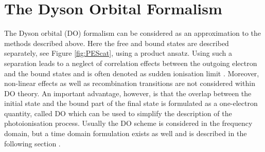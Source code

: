 %

\section{The Dyson Orbital Formalism}
\label{ch:do}
The Dyson orbital (DO) formalism can be considered as an approximation to the methods described above.
Here the free and bound states are described separately, see Figure \ref{fig:PEScat}, using a product ansatz.
Using such a separation leads to a neglect of correlation effects between the outgoing electron and the bound states and is often denoted as sudden ionisation limit \cite{ezDyson,MAgg}.
Moreover, non-linear effects as well as recombination transitions are not considered within DO theory.
An important advantage, however, is that the overlap between the initial state and the bound part of the final state is formulated as a one-electron quantity, called DO which can be used to simplify the description of the photoionisation process.
Usually the DO scheme is considered in the frequency domain, but a time domain formulation exists as well and is described in the following section \cite{TD-do}.

